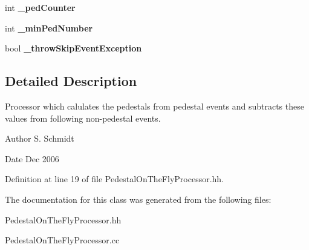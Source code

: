 \begin{DoxyCompactItemize}
\item 
int {\bfseries \-\_\-ped\-Counter}\label{classCALICE_1_1PedestalOnTheFlyProcessor_a33772e03ef01ae351fac171af28920ee}

\item 
int {\bfseries \-\_\-min\-Ped\-Number}\label{classCALICE_1_1PedestalOnTheFlyProcessor_ab104343f3071e7b73d061149f3d09262}

\item 
bool {\bfseries \-\_\-throw\-Skip\-Event\-Exception}\label{classCALICE_1_1PedestalOnTheFlyProcessor_a3a75fe8a1e9a744048d0c5e4e5e59092}

\end{DoxyCompactItemize}


\subsection{Detailed Description}
Processor which calulates the pedestals from pedestal events and subtracts these values from following non-\/pedestal events. 

\begin{DoxyAuthor}{Author}
S. Schmidt 
\end{DoxyAuthor}
\begin{DoxyDate}{Date}
Dec 2006 
\end{DoxyDate}


Definition at line 19 of file Pedestal\-On\-The\-Fly\-Processor.\-hh.



The documentation for this class was generated from the following files\-:\begin{DoxyCompactItemize}
\item 
Pedestal\-On\-The\-Fly\-Processor.\-hh\item 
Pedestal\-On\-The\-Fly\-Processor.\-cc\end{DoxyCompactItemize}
